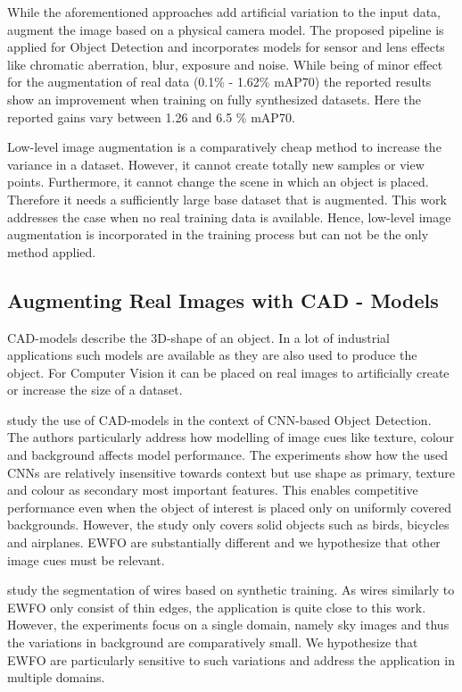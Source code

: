 While the aforementioned approaches add artificial variation to the input data, \citeauthor{Carlson2018}\cite{Carlson2018} augment the image based on a physical camera model. The proposed pipeline is applied for Object Detection and incorporates models for sensor and lens effects like chromatic aberration, blur, exposure and noise. While being of minor effect for the augmentation of real data (0.1\% - 1.62\% \ac{mAP}70) the reported results show an improvement when training on fully synthesized datasets. Here the reported gains vary between 1.26 and 6.5 \% \ac{mAP}70.

Low-level image augmentation is a comparatively cheap method to increase the variance in a dataset. However, it cannot create totally new samples or view points. Furthermore, it cannot change the scene in which an object is placed. Therefore it needs a sufficiently large base dataset that is augmented. This work addresses the case when no real training data is available. Hence, low-level image augmentation is incorporated in the training process but can not be the only method applied.

\subsection{Augmenting Real Images with CAD - Models}

\ac{CAD}-models describe the 3D-shape of an object. In a lot of industrial applications such models are available as they are also used to produce the object. For Computer Vision it can be placed on real images to artificially create or increase the size of a dataset. 

\citeauthor{Peng}\cite{Peng} study the use of \ac{CAD}-models in the context of \ac{CNN}-based Object Detection. The authors particularly address how modelling of image cues like texture, colour and background affects model performance. The experiments show how the used \acp{CNN} are relatively insensitive towards context but use shape as primary, texture and colour as secondary most important features. This enables competitive performance even when the object of interest is placed only on uniformly covered backgrounds. However, the study only covers solid objects such as birds, bicycles and airplanes. \ac{EWFO} are substantially different and we hypothesize that other image cues must be relevant.

\citeauthor{Madaan2017}\cite{Madaan2017} study the segmentation of wires based on synthetic training. As wires similarly to \ac{EWFO} only consist of thin edges, the application is quite close to this work. However, the experiments focus on a single domain, namely sky images and thus the variations in background are comparatively small. We hypothesize that \ac{EWFO} are particularly sensitive to such variations and address the application in multiple domains.

